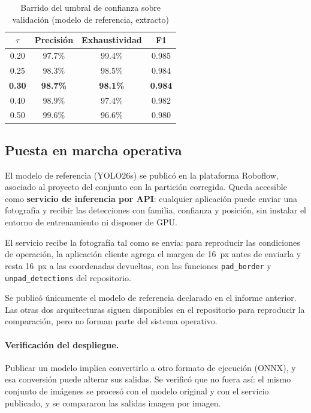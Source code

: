 \documentclass[onecolumn]{article}
\begin{document}
\begin{table}[H]
\centering
\renewcommand{\arraystretch}{1.15}
\caption{Barrido del umbral de confianza sobre validación (modelo de referencia, extracto)}
\label{tab:barrido}
\begin{tabular}{cccc}
\hline
$\tau$ & \textbf{Precisión} & \textbf{Exhaustividad} & \textbf{F1} \\
\hline
0.20 & 97.7\% & 99.4\% & 0.985 \\
0.25 & 98.3\% & 98.5\% & 0.984 \\
\textbf{0.30} & \textbf{98.7\%} & \textbf{98.1\%} & \textbf{0.984} \\
0.40 & 98.9\% & 97.4\% & 0.982 \\
0.50 & 99.6\% & 96.6\% & 0.980 \\
\hline
\end{tabular}
\end{table}

\subsection{Puesta en marcha operativa}

El modelo de referencia (YOLO26s) se publicó en la plataforma Roboflow, asociado al proyecto del conjunto con la partición corregida. Queda accesible como \textbf{servicio de inferencia por API}: cualquier aplicación puede enviar una fotografía y recibir las detecciones con familia, confianza y posición, sin instalar el entorno de entrenamiento ni disponer de GPU.

El servicio recibe la fotografía tal como se envía: para reproducir las condiciones de operación, la aplicación cliente agrega el margen de 16~px antes de enviarla y resta 16~px a las coordenadas devueltas, con las funciones \texttt{pad\_border} y \texttt{unpad\_detections} del repositorio.

Se publicó únicamente el modelo de referencia declarado en el informe anterior. Las otras dos arquitecturas siguen disponibles en el repositorio para reproducir la comparación, pero no forman parte del sistema operativo.

\paragraph{Verificación del despliegue.} Publicar un modelo implica convertirlo a otro formato de ejecución (ONNX), y esa conversión puede alterar sus salidas. Se verificó que no fuera así: el mismo conjunto de imágenes se procesó con el modelo original y con el servicio publicado, y se compararon las salidas imagen por imagen.
\end{document}

